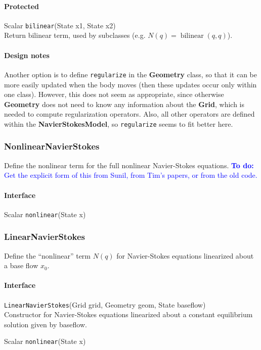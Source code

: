 \documentclass[11pt]{article}
\def\todo#1{\textcolor{blue}{{\bf To do:} #1}}
\def\class#1{{\bf #1}} %
\def\fn#1{{\tt #1}} %
\begin{document}
\paragraph{Protected}
\begin{description}
	\item Scalar \fn{bilinear}(State x1, State x2)\\
		Return bilinear term, used by subclasses (e.g. $N(q)=\operatorname{bilinear}(q,q)$).
\end{description}

\paragraph{Design notes}
Another option is to define \fn{regularize} in the \class{Geometry} class, so that it can be more easily updated when the body moves (then these updates occur only within one class).  However, this does not seem as appropriate, since otherwise \class{Geometry} does not need to know any information about the \class{Grid}, which is needed to compute regularization operators.  Also, all other operators are defined within the \class{NavierStokesModel}, so \fn{regularize} seems to fit better here.

\subsubsection{NonlinearNavierStokes}
Define the nonlinear term for the full nonlinear Navier-Stokes equations.
\todo{Get the explicit form of this from Sunil, from Tim's papers, or from the old code.}
\paragraph{Interface}
\begin{description}
	\item Scalar \fn{nonlinear}(State x)
\end{description}

\subsubsection{LinearNavierStokes}
Define the ``nonlinear'' term $N(q)$ for Navier-Stokes equations linearized about a base flow $x_0$.

\paragraph{Interface}
\begin{description}
	\item \fn{LinearNavierStokes}(Grid grid, Geometry geom, State baseflow)\\
		Constructor for Navier-Stokes equations linearized about a constant equilibrium solution given by baseflow.
	\item Scalar \fn{nonlinear}(State x)
\end{description}
\end{document}
